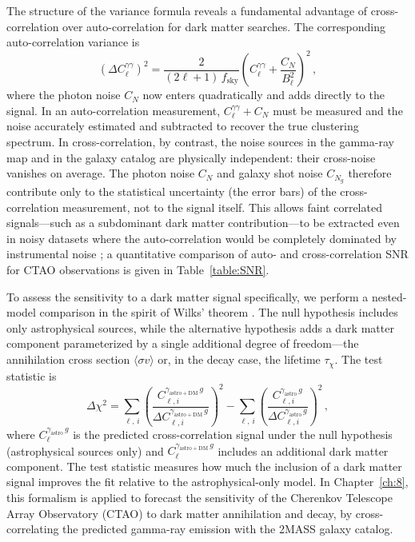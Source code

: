 The structure of the variance formula reveals a fundamental advantage of cross-correlation over auto-correlation for dark matter searches.
The corresponding auto-correlation variance is \cite{Fornengo:2013rga}
\begin{equation}
	(\Delta C_\ell^{\gamma\gamma})^2 = \frac{2}{(2\ell+1)\, f_\mathrm{sky}} \left(C_\ell^{\gamma\gamma} + \frac{C_N}{B_\ell^2}\right)^2\,,
	\label{eq:variance_auto}
\end{equation}
where the photon noise $C_N$ now enters quadratically and adds directly to the signal.
In an auto-correlation measurement, $C_\ell^{\gamma\gamma} + C_N$ must be measured and the noise accurately estimated and subtracted to recover the true clustering spectrum.
In cross-correlation, by contrast, the noise sources in the gamma-ray map and in the galaxy catalog are physically independent: their cross-noise vanishes on average.
The photon noise $C_N$ and galaxy shot noise $C_{N_g}$ therefore contribute only to the statistical uncertainty (the error bars) of the cross-correlation measurement, not to the signal itself.
This allows faint correlated signals---such as a subdominant dark matter contribution---to be extracted even in noisy datasets where the auto-correlation would be completely dominated by instrumental noise \cite{Fornengo:2013rga,Camera:2012cj}; a quantitative comparison of auto- and cross-correlation SNR for CTAO observations is given in Table~\ref{table:SNR}.

To assess the sensitivity to a dark matter signal specifically, we perform a nested-model comparison in the spirit of Wilks' theorem \cite{Fornengo:2013rga}.
The null hypothesis includes only astrophysical sources, while the alternative hypothesis adds a dark matter component parameterized by a single additional degree of freedom---the annihilation cross section $\langle \sigma v \rangle$ or, in the decay case, the lifetime $\tau_\chi$.
The test statistic is
\begin{equation}
	\Delta\chi^2 = \sum_{\ell,\, i} \left(\frac{C_{\ell,i}^{\gamma_\mathrm{astro+DM}\, g}}{\Delta C_{\ell,i}^{\gamma_\mathrm{astro+DM}\, g}}\right)^2 - \sum_{\ell,\, i} \left(\frac{C_{\ell,i}^{\gamma_\mathrm{astro}\, g}}{\Delta C_{\ell,i}^{\gamma_\mathrm{astro}\, g}}\right)^2\,,
	\label{eq:delta_chi2}
\end{equation}
where $C_{\ell}^{\gamma_\mathrm{astro}\, g}$ is the predicted cross-correlation signal under the null hypothesis (astrophysical sources only) and $C_{\ell}^{\gamma_\mathrm{astro+DM}\, g}$ includes an additional dark matter component.
The test statistic measures how much the inclusion of a dark matter signal improves the fit relative to the astrophysical-only model.
In Chapter~\ref{ch:8}, this formalism is applied to forecast the sensitivity of the Cherenkov Telescope Array Observatory (CTAO) to dark matter annihilation and decay, by cross-correlating the predicted gamma-ray emission with the 2MASS galaxy catalog.
